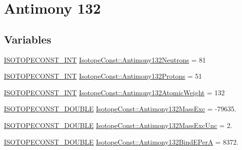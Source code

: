 \hypertarget{group___isotope_const-_antimony-_sb132}{}\section{Antimony 132}
\label{group___isotope_const-_antimony-_sb132}
\subsection*{Variables}
\begin{DoxyCompactItemize}
\item 
\mbox{\hyperlink{group___isotope_const-_macros_ga5f18360b3e99483a35c32d789e62621c}{I\+S\+O\+T\+O\+P\+E\+C\+O\+N\+S\+T\+\_\+\+I\+NT}} \mbox{\hyperlink{group___isotope_const-_antimony-_sb132_ga2b4032e5a67d4b02e5038ad4167569f1}{Isotope\+Const\+::\+Antimony132\+Neutrons}} = 81
\item 
\mbox{\hyperlink{group___isotope_const-_macros_ga5f18360b3e99483a35c32d789e62621c}{I\+S\+O\+T\+O\+P\+E\+C\+O\+N\+S\+T\+\_\+\+I\+NT}} \mbox{\hyperlink{group___isotope_const-_antimony-_sb132_gac4f2dd27ae216951d7b4a0a6b7f3ed07}{Isotope\+Const\+::\+Antimony132\+Protons}} = 51
\item 
\mbox{\hyperlink{group___isotope_const-_macros_ga5f18360b3e99483a35c32d789e62621c}{I\+S\+O\+T\+O\+P\+E\+C\+O\+N\+S\+T\+\_\+\+I\+NT}} \mbox{\hyperlink{group___isotope_const-_antimony-_sb132_gaeca2b6f757d7211d912256bd8ae5aafa}{Isotope\+Const\+::\+Antimony132\+Atomic\+Weight}} = 132
\item 
\mbox{\hyperlink{group___isotope_const-_macros_ga8f45a7272ce02c0b4c65c44636ed719a}{I\+S\+O\+T\+O\+P\+E\+C\+O\+N\+S\+T\+\_\+\+D\+O\+U\+B\+LE}} \mbox{\hyperlink{group___isotope_const-_antimony-_sb132_ga8882e05fe71c3a9f0ed05237143b05c1}{Isotope\+Const\+::\+Antimony132\+Mass\+Exc}} = -\/79635.
\item 
\mbox{\hyperlink{group___isotope_const-_macros_ga8f45a7272ce02c0b4c65c44636ed719a}{I\+S\+O\+T\+O\+P\+E\+C\+O\+N\+S\+T\+\_\+\+D\+O\+U\+B\+LE}} \mbox{\hyperlink{group___isotope_const-_antimony-_sb132_ga7d7205c97a2996efe7e94f43ac854c45}{Isotope\+Const\+::\+Antimony132\+Mass\+Exc\+Unc}} = 2.
\item 
\mbox{\hyperlink{group___isotope_const-_macros_ga8f45a7272ce02c0b4c65c44636ed719a}{I\+S\+O\+T\+O\+P\+E\+C\+O\+N\+S\+T\+\_\+\+D\+O\+U\+B\+LE}} \mbox{\hyperlink{group___isotope_const-_antimony-_sb132_ga9d5d8e8ade468432e4acde96394dae82}{Isotope\+Const\+::\+Antimony132\+Bind\+E\+PerA}} = 8372.
\item 

\end{DoxyCompactItemize}
